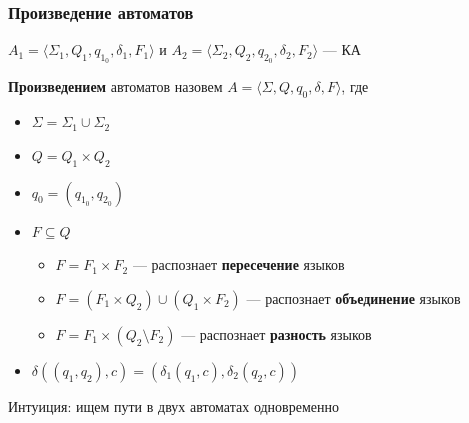 \documentclass{beamer}
\begin{document}
\begin{frame}[fragile]
\begin{center}
{
    }
  \end{center}

\end{frame}

\begin{frame}[fragile]
  \transwipe[direction=90]
  \frametitle{Произведение автоматов}
   $A_1 = \langle \Sigma_1, Q_1, q_{1_0}, \delta_1, F_1 \rangle$ и $A_2 = \langle \Sigma_2, Q_2, q_{2_0}, \delta_2, F_2 \rangle$ --- КА
  
   \vfill 

  \textbf{Произведением} автоматов назовем $A = \langle \Sigma, Q, q_0, \delta, F \rangle$, где

  \vfill

  \begin{itemize}
    \item $\Sigma = \Sigma_1 \cup \Sigma_2$
    \item $Q = Q_1 \times Q_2$
    \item $q_0 = (q_{1_0}, q_{2_0})$
    \item $F \subseteq Q$
    \begin{itemize}
      \item $F = F_1 \times F_2$ --- распознает \textbf{пересечение} языков
      \item $F = (F_1 \times Q_2) \cup (Q_1 \times F_2)$ --- распознает \textbf{объединение} языков
      \item $F = F_1 \times (Q_2 \setminus F_2)$ --- распознает \textbf{разность} языков
    \end{itemize}
    \item $\delta((q_1, q_2), c) = (\delta_1(q_1, c), \delta_2(q_2, c))$
  \end{itemize}
  
  \vfill 

  Интуиция: ищем пути в двух автоматах одновременно
\end{frame}
\end{document}
